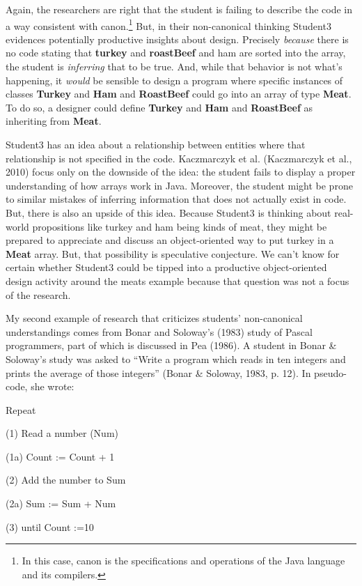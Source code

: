Again, the researchers are right that the student is failing to describe
the code in a way consistent with canon.\footnote{In this case, canon is
  the specifications and operations of the Java language and its
  compilers.} But, in their non-canonical thinking Student3 evidences
potentially productive insights about design. Precisely \emph{because}
there is no code stating that \textbf{turkey} and \textbf{roastBeef} and
ham are sorted into the array, the student is \emph{inferring} that to
be true. And, while that behavior is not what's happening, it
\emph{would} be sensible to design a program where specific instances of
classes \textbf{Turkey} and \textbf{Ham} and \textbf{RoastBeef} could go
into an array of type \textbf{Meat}. To do so, a designer could define
\textbf{Turkey} and \textbf{Ham} and \textbf{RoastBeef} as inheriting
from \textbf{Meat}.

Student3 has an idea about a relationship between entities where that
relationship is not specified in the code. Kaczmarczyk et al.
(Kaczmarczyk et al., 2010) focus only on the downside of the idea: the
student fails to display a proper understanding of how arrays work in
Java. Moreover, the student might be prone to similar mistakes of
inferring information that does not actually exist in code. But, there
is also an upside of this idea. Because Student3 is thinking about
real-world propositions like turkey and ham being kinds of meat, they
might be prepared to appreciate and discuss an object-oriented way to
put turkey in a \textbf{Meat} array. But, that possibility is
speculative conjecture. We can't know for certain whether Student3 could
be tipped into a productive object-oriented design activity around the
meats example because that question was not a focus of the research.

My second example of research that criticizes students' non-canonical
understandings comes from Bonar and Soloway's (1983) study of Pascal
programmers, part of which is discussed in Pea (1986). A student in
Bonar \& Soloway's study was asked to ``Write a program which reads in
ten integers and prints the average of those integers'' (Bonar \&
Soloway, 1983, p. 12). In pseudo-code, she wrote:

Repeat

(1) Read a number (Num)

(1a) Count := Count + 1

(2) Add the number to Sum

(2a) Sum := Sum + Num

(3) until Count :=10

